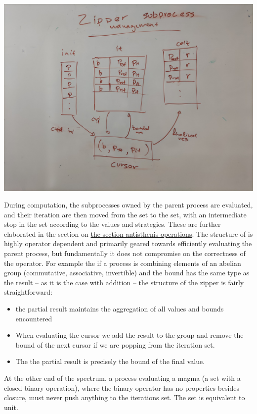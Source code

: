 \begin{center}
  \includegraphics[width=.9\linewidth]{./imgs/2021-10-08_17-08-40_screenshot.png}
\end{center}

During computation, the subprocesses owned by the parent process are
evaluated, and their iteration are then moved from the 
set to the  set, with an intermediate stop in the
 set according to the values and strategies. These
are further elaborated in the section on \hyperref[sec:antisthenis_ops]{the
  section antisthenis operations}. The structure of  is highly operator dependent and primarily geared towards
efficiently evaluating the parent process, but fundamentally it does
not compromise on the correctness of the operator. For example the if
a process is combining elements of an abelian group (commutative,
associative, invertible) and the bound has the same type as the result
-- as it is the case with addition -- the structure of the zipper is
fairly straightforward:

\begin{itemize}
\item the partial result maintains the aggregation of all values and
  bounds encountered
\item When evaluating the cursor we add the result to the group and
  remove the bound of the next cursor if we are popping from the
  iteration set.
\item The the partial result is precisely the bound of the final
  value.
\end{itemize}

At the other end of the spectrum, a process evaluating a magma (a set
with a closed binary operation), where the binary operator has no
properties besides closure, must never push anything to the iterations
set. The set is equivalent to unit.

